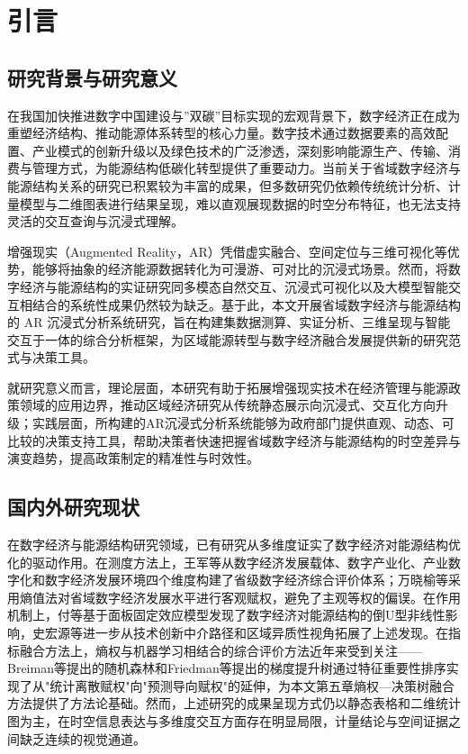 \chapter{引言}
\label{ch:introduction}

\section{研究背景与研究意义}

在我国加快推进数字中国建设与”双碳”目标实现的宏观背景下，数字经济正在成为重塑经济结构、推动能源体系转型的核心力量。数字技术通过数据要素的高效配置、产业模式的创新升级以及绿色技术的广泛渗透，深刻影响能源生产、传输、消费与管理方式，为能源结构低碳化转型提供了重要动力\cite{guojia2025}。当前关于省域数字经济与能源结构关系的研究已积累较为丰富的成果，但多数研究仍依赖传统统计分析、计量模型与二维图表进行结果呈现，难以直观展现数据的时空分布特征，也无法支持灵活的交互查询与沉浸式理解。

增强现实（Augmented Reality，AR）凭借虚实融合、空间定位与三维可视化等优势，能够将抽象的经济能源数据转化为可漫游、可对比的沉浸式场景\cite{Liu_Jia_Nie_Rosenberg_Interrante_Zhu-Tian_2025}。然而，将数字经济与能源结构的实证研究同多模态自然交互、沉浸式可视化以及大模型智能交互相结合的系统性成果仍然较为缺乏。基于此，本文开展省域数字经济与能源结构的 AR 沉浸式分析系统研究，旨在构建集数据测算、实证分析、三维呈现与智能交互于一体的综合分析框架，为区域能源转型与数字经济融合发展提供新的研究范式与决策工具。

就研究意义而言，理论层面，本研究有助于拓展增强现实技术在经济管理与能源政策领域的应用边界，推动区域经济研究从传统静态展示向沉浸式、交互化方向升级；实践层面，所构建的AR沉浸式分析系统能够为政府部门提供直观、动态、可比较的决策支持工具，帮助决策者快速把握省域数字经济与能源结构的时空差异与演变趋势，提高政策制定的精准性与时效性。

\section{国内外研究现状}

在数字经济与能源结构研究领域，已有研究从多维度证实了数字经济对能源结构优化的驱动作用。在测度方法上，王军等从数字经济发展载体、数字产业化、产业数字化和数字经济发展环境四个维度构建了省级数字经济综合评价体系；万晓榆等采用熵值法对省域数字经济发展水平进行客观赋权，避免了主观等权的偏误\cite{wanxiaoyu2022}。在作用机制上，付等基于面板固定效应模型发现了数字经济对能源结构的倒U型非线性影响\cite{fu2025}，史宏源等进一步从技术创新中介路径和区域异质性视角拓展了上述发现\cite{shihongyuan2026}。在指标融合方法上，熵权与机器学习相结合的综合评价方法近年来受到关注——Breiman等提出的随机森林\cite{breiman2001randomforests}和Friedman等提出的梯度提升树\cite{friedman2001greedy}通过特征重要性排序实现了从"统计离散赋权"向"预测导向赋权"的延伸，为本文第五章熵权—决策树融合方法提供了方法论基础。然而，上述研究的成果呈现方式仍以静态表格和二维统计图为主，在时空信息表达与多维度交互方面存在明显局限，计量结论与空间证据之间缺乏连续的视觉通道。

